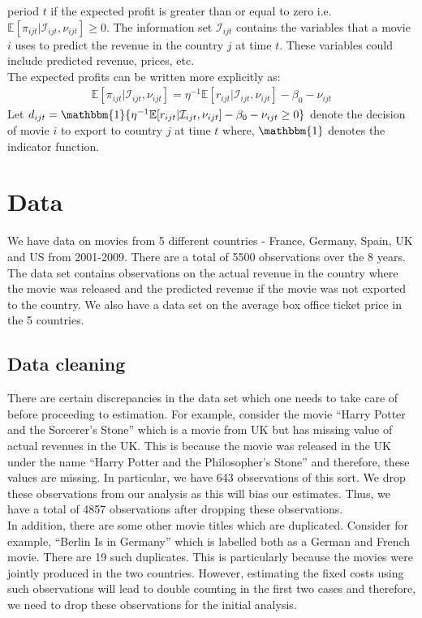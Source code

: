 \documentclass[11pt, letterpaper]{article} \usepackage{amsmath}
\begin{document}
period $t$ if the expected profit is greater than or equal to zero
i.e. $\mathbb{E}[\pi_{ijt} | \mathcal{I}_{ijt}, \nu_{ijt}] \geq 0$.
The information set $\mathcal{I}_{ijt}$ contains the variables that a
movie $i$ uses to predict the revenue in the country $j$ at time
$t$. These variables could include predicted revenue, prices, etc.\\
The expected profits can be written more explicitly as:
\begin{align*}
  \mathbb{E}[\pi_{ijt}|\mathcal{I}_{ijt}, \nu_{ijt}] = \eta^{-1}
  \mathbb{E}[r_{ijt} | \mathcal{I}_{ijt}, \nu_{ijt}] - \beta_0 - \nu_{ijt}
\end{align*}
Let
$d_{ijt} = \mathbbm{1}\{\eta^{-1}\mathbb{E}[r_{ijt} |
\mathcal{I}_{ijt}, \nu_{ijt}] - \beta_0 - \nu_{ijt} \geq 0\}$
denote the decision of movie $i$ to export to country $j$ at time $t$
where, $\mathbbm{1}$ denotes the indicator function.
\section{Data}
We have data on movies from 5 different countries - France, Germany,
Spain, UK and US from 2001-2009. There are a total of 5500
observations over the 8 years. The data set contains observations on
the actual revenue in the country where the movie was released and the
predicted revenue if the movie was not exported to the country. We
also have a data set on the average box office ticket price in the 5
countries.
\subsection{Data cleaning}
There are certain discrepancies in the data set which one needs to
take care of before proceeding to estimation. For example, consider
the movie ``Harry Potter and the Sorcerer's Stone'' which is a movie
from UK but has missing value of actual revenues in the UK. This is
because the movie was released in the UK under the name ``Harry Potter
and the Philosopher's Stone'' and therefore, these values are
missing. In particular, we have 643 observations of this sort. We drop
these observations from our analysis as this will bias our
estimates. Thus, we have a total of 4857 observations after
dropping these observations. \\
In addition, there are some other movie titles which are
duplicated. Consider for example, ``Berlin Is in Germany'' which is
labelled both as a German and French movie. There are 19 such
duplicates. This is particularly because the movies were jointly
produced in the two countries. However, estimating the fixed costs
using such observations will lead to double counting in the first two
cases and therefore, we need to drop these observations for the
initial analysis.
\end{document}
